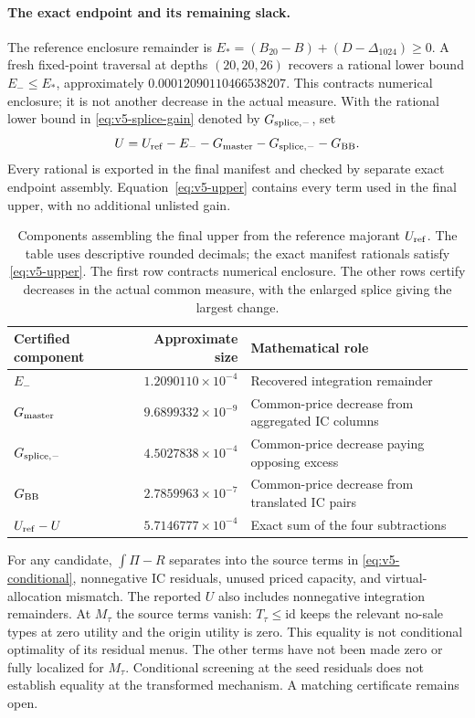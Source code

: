 \paragraph{The exact endpoint and its remaining slack.}
The reference enclosure remainder is
$E_*=(B_{20}-B)+(D-\Delta_{1024})\ge0$.
A fresh fixed-point traversal at depths $(20,20,26)$ recovers a rational
lower bound $E_-\le E_*$, approximately $0.00012090110466538207$.
This contracts numerical enclosure; it is not another decrease in the
actual measure. With the rational lower bound in
\eqref{eq:v5-splice-gain} denoted by $G_{{\rm splice},-}$, set
\begin{equation}\label{eq:v5-upper}
 U=U_{\rm ref}-E_- -G_{\rm master}-G_{{\rm splice},-}-G_{\rm BB}.
\end{equation}
Every rational is exported in the final manifest and checked by separate
exact endpoint assembly. Equation~\eqref{eq:v5-upper} contains every term
used in the final upper, with no additional unlisted gain.

\begin{table}[ht]
\centering\small
\begin{tabular}{p{}rp{}}
\toprule
Certified component & Approximate size & Mathematical role\\
\midrule
$E_-$ & $1.2090110\times10^{-4}$ & Recovered integration remainder\\
$G_{\rm master}$ & $9.6899332\times10^{-9}$ & Common-price decrease from aggregated IC columns\\
$G_{{\rm splice},-}$ & $4.5027838\times10^{-4}$ & Common-price decrease paying opposing excess\\
$G_{\rm BB}$ & $2.7859963\times10^{-7}$ & Common-price decrease from translated IC pairs\\
\midrule
$U_{\rm ref}-U$ & $5.7146777\times10^{-4}$ & Exact sum of the four subtractions\\
\bottomrule
\end{tabular}
\caption{Components assembling the final upper from the reference
majorant $U_{\rm ref}$. The table uses descriptive rounded decimals; the
exact manifest rationals satisfy \eqref{eq:v5-upper}. The first row
contracts numerical enclosure. The other rows certify decreases in the
actual common measure, with the enlarged splice giving the largest change.}
\label{tab:v5-upper-components}
\end{table}

For any candidate, $\int\Pi-R$ separates into the source terms in
\eqref{eq:v5-conditional}, nonnegative IC residuals, unused priced
capacity, and virtual-allocation mismatch. The reported $U$ also
includes nonnegative integration remainders. At $M_\tau$ the source
terms vanish: $T_\tau\le\mathrm{id}$ keeps the relevant no-sale types
at zero utility and the origin utility is zero. This equality is not
conditional optimality of its residual menus. The other terms have not
been made zero or fully localized for $M_\tau$. Conditional screening at the seed residuals does not
establish equality at the transformed mechanism. A matching certificate remains open.
